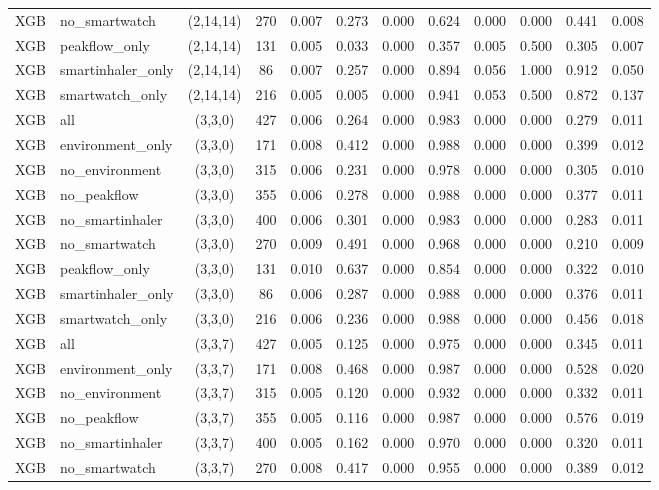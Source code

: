 \begin{longtable}{llcccccccccc}
XGB & no\_smartwatch & (2,14,14) & 270 & 0.007 & 0.273 & 0.000 & 0.624 & 0.000 & 0.000 & 0.441 & 0.008 \\
XGB & peakflow\_only & (2,14,14) & 131 & 0.005 & 0.033 & 0.000 & 0.357 & 0.005 & 0.500 & 0.305 & 0.007 \\
XGB & smartinhaler\_only & (2,14,14) & 86 & 0.007 & 0.257 & 0.000 & 0.894 & 0.056 & 1.000 & 0.912 & 0.050 \\
XGB & smartwatch\_only & (2,14,14) & 216 & 0.005 & 0.005 & 0.000 & 0.941 & 0.053 & 0.500 & 0.872 & 0.137 \\
XGB & all & (3,3,0) & 427 & 0.006 & 0.264 & 0.000 & 0.983 & 0.000 & 0.000 & 0.279 & 0.011 \\
XGB & environment\_only & (3,3,0) & 171 & 0.008 & 0.412 & 0.000 & 0.988 & 0.000 & 0.000 & 0.399 & 0.012 \\
XGB & no\_environment & (3,3,0) & 315 & 0.006 & 0.231 & 0.000 & 0.978 & 0.000 & 0.000 & 0.305 & 0.010 \\
XGB & no\_peakflow & (3,3,0) & 355 & 0.006 & 0.278 & 0.000 & 0.988 & 0.000 & 0.000 & 0.377 & 0.011 \\
XGB & no\_smartinhaler & (3,3,0) & 400 & 0.006 & 0.301 & 0.000 & 0.983 & 0.000 & 0.000 & 0.283 & 0.011 \\
XGB & no\_smartwatch & (3,3,0) & 270 & 0.009 & 0.491 & 0.000 & 0.968 & 0.000 & 0.000 & 0.210 & 0.009 \\
XGB & peakflow\_only & (3,3,0) & 131 & 0.010 & 0.637 & 0.000 & 0.854 & 0.000 & 0.000 & 0.322 & 0.010 \\
XGB & smartinhaler\_only & (3,3,0) & 86 & 0.006 & 0.287 & 0.000 & 0.988 & 0.000 & 0.000 & 0.376 & 0.011 \\
XGB & smartwatch\_only & (3,3,0) & 216 & 0.006 & 0.236 & 0.000 & 0.988 & 0.000 & 0.000 & 0.456 & 0.018 \\
XGB & all & (3,3,7) & 427 & 0.005 & 0.125 & 0.000 & 0.975 & 0.000 & 0.000 & 0.345 & 0.011 \\
XGB & environment\_only & (3,3,7) & 171 & 0.008 & 0.468 & 0.000 & 0.987 & 0.000 & 0.000 & 0.528 & 0.020 \\
XGB & no\_environment & (3,3,7) & 315 & 0.005 & 0.120 & 0.000 & 0.932 & 0.000 & 0.000 & 0.332 & 0.011 \\
XGB & no\_peakflow & (3,3,7) & 355 & 0.005 & 0.116 & 0.000 & 0.987 & 0.000 & 0.000 & 0.576 & 0.019 \\
XGB & no\_smartinhaler & (3,3,7) & 400 & 0.005 & 0.162 & 0.000 & 0.970 & 0.000 & 0.000 & 0.320 & 0.011 \\
XGB & no\_smartwatch & (3,3,7) & 270 & 0.008 & 0.417 & 0.000 & 0.955 & 0.000 & 0.000 & 0.389 & 0.012 \\

\end{longtable}
